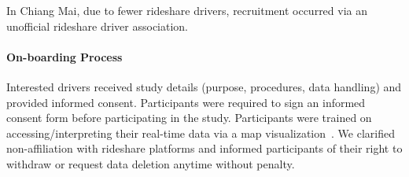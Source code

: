 In Chiang Mai, due to fewer rideshare drivers, recruitment occurred via an unofficial rideshare driver association.

\paragraph{On-boarding Process}

Interested drivers received study details (purpose, procedures, data handling) and provided informed consent.
Participants were required to sign an informed consent form before participating in the study.
Participants were trained on accessing/interpreting their real-time data via a map visualization~\cite{mapvis}.
We clarified non-affiliation with rideshare platforms and informed participants of their right to withdraw or request data deletion anytime without penalty.



